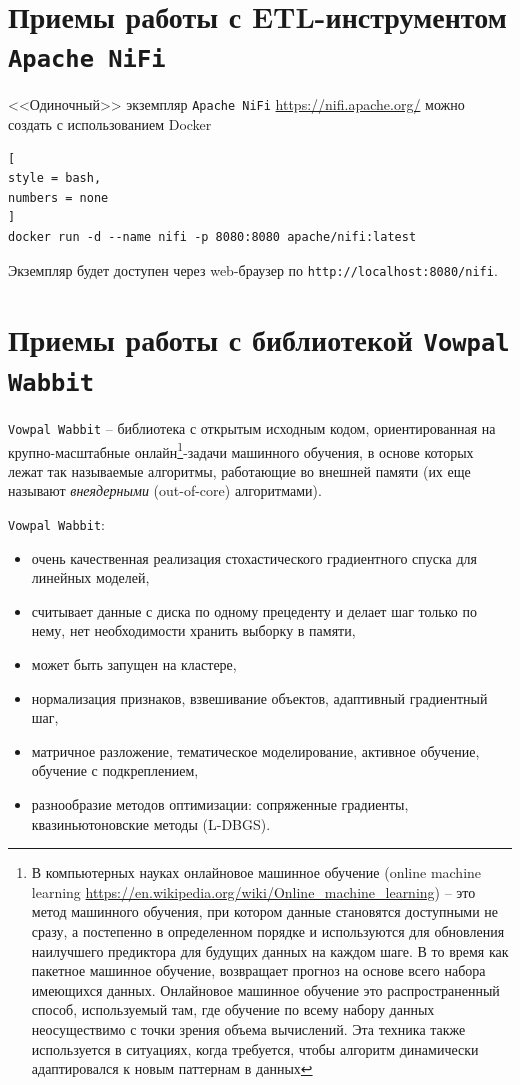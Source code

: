 \documentclass[%
	11pt,
	a4paper,
	utf8,
		]{article}
\begin{document}
\section{Приемы работы с ETL-инструментом \texttt{Apache NiFi}}

<<Одиночный>> экземпляр \texttt{Apache NiFi} \url{https://nifi.apache.org/} можно создать с использованием Docker
\begin{lstlisting}[
style = bash,
numbers = none
]
docker run -d --name nifi -p 8080:8080 apache/nifi:latest
\end{lstlisting}

Экземпляр будет доступен через web-браузер по \verb|http://localhost:8080/nifi|.



\section{Приемы работы с библиотекой \texttt{Vowpal Wabbit}}

\texttt{Vowpal Wabbit} -- библиотека с открытым исходным кодом, ориентированная на крупно-масштабные онлайн\footnote{В компьютерных науках онлайновое машинное обучение (online machine learning \url{https://en.wikipedia.org/wiki/Online_machine_learning}) -- это метод машинного обучения, при котором данные становятся доступными не сразу, а постепенно в определенном порядке и используются для обновления наилучшего предиктора для будущих данных на каждом шаге. В то время как пакетное машинное обучение, возвращает прогноз на основе всего набора имеющихся данных. Онлайновое машинное обучение это распространенный способ, используемый там, где обучение по всему набору данных неосуществимо с точки зрения объема вычислений. Эта техника также используется в ситуациях, когда требуется, чтобы алгоритм динамически адаптировался к новым паттернам в данных}-задачи машинного обучения, в основе которых лежат так называемые алгоритмы, работающие во внешней памяти (их еще называют \emph{внеядерными} (out-of-core) алгоритмами). 

\texttt{Vowpal Wabbit}:
\begin{itemize}
	\item очень качественная реализация стохастического градиентного спуска для линейных моделей,
	
	\item считывает данные с диска по одному прецеденту и делает шаг только по нему, нет необходимости хранить выборку в памяти,
	
	\item может быть запущен на кластере,
	
	\item нормализация признаков, взвешивание объектов, адаптивный градиентный шаг,
	
	\item матричное разложение, тематическое моделирование, активное обучение, обучение с подкреплением,
	
	\item разнообразие методов оптимизации: сопряженные градиенты, квазиньютоновские методы (L-DBGS).
\end{itemize}
\end{document}
